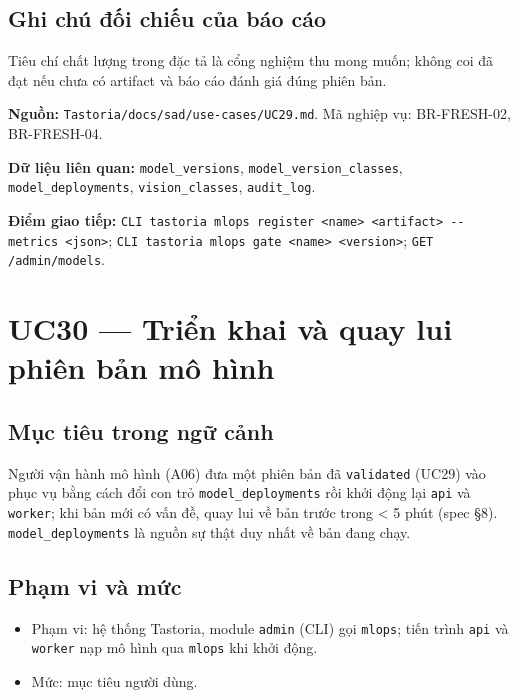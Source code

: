 \subsection{Ghi chú đối chiếu của báo cáo}
Tiêu chí chất lượng trong đặc tả là cổng nghiệm thu mong muốn; không coi đã đạt nếu chưa có artifact và báo cáo đánh giá đúng phiên bản.

\textbf{Nguồn:} {\small\texttt{Tastoria/\allowbreak{}\allowbreak{}docs/\allowbreak{}\allowbreak{}sad/\allowbreak{}\allowbreak{}use-\allowbreak{}cases/\allowbreak{}\allowbreak{}UC29.\allowbreak{}md}}. Mã nghiệp vụ: BR-\allowbreak{}FRESH-\allowbreak{}02, BR-\allowbreak{}FRESH-\allowbreak{}04.

\textbf{Dữ liệu liên quan:} {\small\texttt{model\_\allowbreak{}\allowbreak{}versions}}, {\small\texttt{model\_\allowbreak{}\allowbreak{}version\_\allowbreak{}\allowbreak{}classes}}, {\small\texttt{model\_\allowbreak{}\allowbreak{}deployments}}, {\small\texttt{vision\_\allowbreak{}\allowbreak{}classes}}, {\small\texttt{audit\_\allowbreak{}\allowbreak{}log}}.

\textbf{Điểm giao tiếp:} {\small\texttt{CLI tastoria mlops register <name> <artifact> -\allowbreak{}-\allowbreak{}metrics <json>}}; {\small\texttt{CLI tastoria mlops gate <name> <version>}}; {\small\texttt{GET /\allowbreak{}\allowbreak{}admin/\allowbreak{}\allowbreak{}models}}.

\section{UC30 --- Triển khai và quay lui phiên bản mô hình}
\subsection{Mục tiêu trong ngữ cảnh}
Người vận hành mô hình (A06) đưa một phiên bản đã {\small\texttt{validated}} (UC29) vào phục vụ bằng cách đổi con trỏ {\small\texttt{model\_\allowbreak{}\allowbreak{}deployments}} rồi khởi động lại {\small\texttt{api}} và {\small\texttt{worker}}; khi bản mới có vấn đề, quay lui về bản trước trong < 5 phút (spec \S{}8). {\small\texttt{model\_\allowbreak{}\allowbreak{}deployments}} là nguồn sự thật duy nhất về bản đang chạy.

\subsection{Phạm vi và mức}
\begin{itemize}
\item Phạm vi: hệ thống Tastoria, module {\small\texttt{admin}} (CLI) gọi {\small\texttt{mlops}}; tiến trình {\small\texttt{api}} và {\small\texttt{worker}} nạp mô hình qua {\small\texttt{mlops}} khi khởi động.
\item Mức: mục tiêu người dùng.
\end{itemize}
